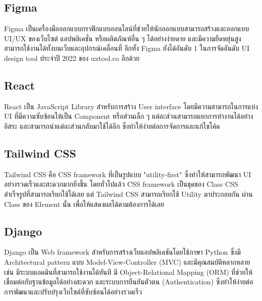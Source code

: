 \documentclass[12pt,oneside,openright,a4paper]{cpe-thai-project}
\begin{document}
\subsection{Figma}

\hspace{1cm}
Figma \cite{Figma} เป็นเครื่องมือออกแบบกราฟิกแบบออนไลน์ที่ช่วยให้นักออกแบบสามารถสร้างและออกแบบ UI/UX ของเว็บไซต์
แอปพลิเคชั่น หรือผลิตภัณฑ์อื่น ๆ ได้อย่างง่ายดาย และมีความยืดหยุ่นสูง สามารถใช้งานได้ทั้งบนเว็บและอุปกรณ์เคลื่อนที่
อีกทั้ง Figma ยังได้อันดับ 1 ในการจัดอันดับ UI design tool ประจำปี 2022 ของ uxtool.co อีกด้วย

\subsection{React}

\hspace{1cm}
React \cite{React} เป็น JavaScript Library สำหรับการสร้าง User interface โดยมีความสามารถในการแบ่ง UI ที่มีความซับซ้อนให้เป็น Component หรือส่วนเล็ก ๆ
แต่ละส่วนสามารถแยกการทำงานได้อย่างอิสระ และสามารถนำแต่ละส่วนกลับมาใช้ได้อีก ซึ่งทำให้ง่ายต่อการจัดการและแก้ไขโค้ด

\subsection{Tailwind CSS}

\hspace{1cm}
Tailwind CSS \cite{Tailwind} คือ CSS framework ที่เป็นรูปแบบ "utility-first" ซึ่งทำให้สามารถพัฒนา UI อย่างรวดเร็วและสะดวกมากยิ่งขึ้น
โดยทั่วไปแล้ว CSS framework เป็นชุดของ Class CSS สำเร็จรูปที่สามารถเรียกใช้ได้เลย แต่ Tailwind CSS สามารถเรียกใช้ Utility มาประกอบกัน
ผ่าน Class ของ Element นั้น เพื่อให้แสดงผลได้ตามต้องการได้เลย

\subsection{Django}

\hspace{1cm}
Django \cite{Django} เป็น Web framework สำหรับการสร้างเว็บแอปพลิเคชันโดยใช้ภาษา Python ซึ่งมี Architectural pattern
แบบ Model-View-Controller (MVC) และมีคุณสมบัติหลากหลาย เช่น มีระบบแอดมินที่สามารถใช้งานได้ทันที
มี Object-Relational Mapping (ORM) ที่ช่วยให้เชื่อมต่อกับฐานข้อมูลได้อย่างสะดวก และระบบการยืนยันตัวตน (Authentication)
ซึ่งทำให้ง่ายต่อการพัฒนาและปรับปรุงเว็บไซต์ที่ซับซ้อนได้อย่างรวดเร็ว
\end{document}
